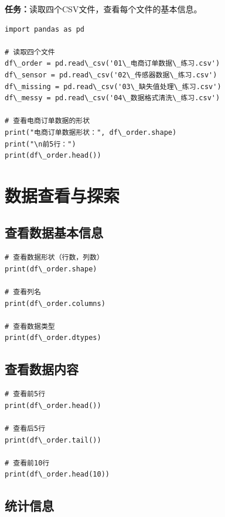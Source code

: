 \documentclass[12pt,a4paper]{article}
\begin{document}
\begin{practicebox}
\textbf{任务：}读取四个CSV文件，查看每个文件的基本信息。

\begin{lstlisting}
import pandas as pd

# 读取四个文件
df\_order = pd.read\_csv('01\_电商订单数据\_练习.csv')
df\_sensor = pd.read\_csv('02\_传感器数据\_练习.csv')
df\_missing = pd.read\_csv('03\_缺失值处理\_练习.csv')
df\_messy = pd.read\_csv('04\_数据格式清洗\_练习.csv')

# 查看电商订单数据的形状
print("电商订单数据形状：", df\_order.shape)
print("\n前5行：")
print(df\_order.head())
\end{lstlisting}
\end{practicebox}

\section{数据查看与探索}

\subsection{查看数据基本信息}

\begin{lstlisting}[caption={查看数据形状和列名}]
# 查看数据形状（行数，列数）
print(df\_order.shape)

# 查看列名
print(df\_order.columns)

# 查看数据类型
print(df\_order.dtypes)
\end{lstlisting}

\subsection{查看数据内容}

\begin{lstlisting}[caption={查看数据内容}]
# 查看前5行
print(df\_order.head())

# 查看后5行
print(df\_order.tail())

# 查看前10行
print(df\_order.head(10))
\end{lstlisting}

\subsection{统计信息}
\end{document}
